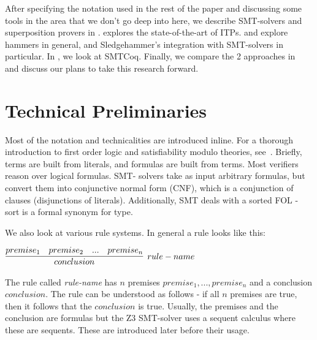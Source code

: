 \documentclass{article}
\begin{document}
	After specifying the notation used in the rest of the 
	paper and discussing some tools in the area that 
	we don't go deep into here, we describe SMT-solvers
	and superposition provers in .
	 explores the state-of-the-art 
	of ITPs.  and 
	explore hammers in general, and Sledgehammer's
	integration with SMT-solvers in particular. In
	, we look at SMTCoq. Finally, we 
	compare the 2 approaches in ~ and 
	discuss our plans to take this research forward.

\section{Technical Preliminaries}
\label{sec:prelim}
	Most of the notation and technicalities are 
	introduced inline. For a thorough introduction 
	to first order logic and satisfiability 
	modulo theories, 
	see~\cite{DBLP:reference/mc/BarrettT18}.
	Briefly, terms are built from literals, 
	and formulas are built from terms. Most 
	verifiers reason over logical formulas. SMT-
	solvers take as input arbitrary formulas, 
	but convert them into conjunctive normal
	form (CNF), which is a conjunction 
	of clauses (disjunctions of literals).
	Additionally, SMT deals with a sorted FOL -
	sort is a formal synonym for type. 
	
	We also look at various rule systems. In 
	general a rule looks like this:
	\begin{center}
		$\infer[rule-name]{conclusion}
			{premise_1 & premise_2 & ... & premise_n}$
	\end{center}
	The rule called \textit{rule-name} has $n$ 
	premises $premise_1, ... , premise_n$ and a 
	conclusion $conclusion$. The rule can be 
	understood as follows - if all $n$ premises 
	are true, then it follows that the $conclusion$
	is true. Usually, the premises and the conclusion 
	are formulas but the Z3 SMT-solver uses a 
	sequent calculus where these are sequents. 
	These are introduced later before their usage.
	
\end{document}
